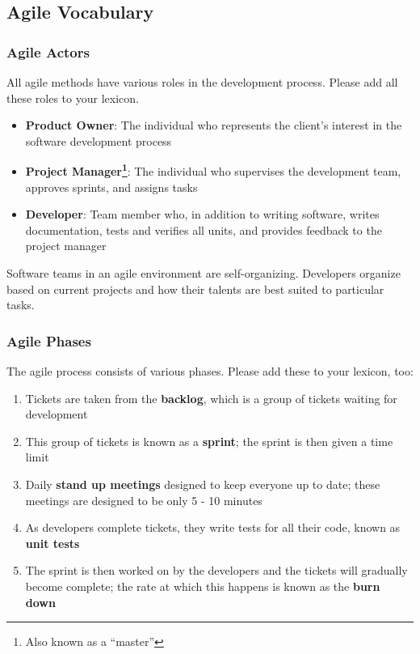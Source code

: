 \documentclass[aspectratio=169]{beamer}
\begin{document}
\subsection{Agile Vocabulary}
\begin{frame}
\frametitle{Agile Actors}
All agile methods have various roles in the development process. Please add all these roles to your lexicon.
\begin{itemize}
	\item \textbf{Product Owner}: The individual who represents the client's interest in the software development process
	\item \textbf{Project Manager\footnote{Also known as a ``master''}}: The individual who supervises the development team, approves sprints, and assigns tasks
	\item \textbf{Developer}: Team member who, in addition to writing software, writes documentation, tests and verifies all units, and provides feedback to the project manager
\end{itemize}
Software teams in an agile environment are self-organizing. Developers organize based on current projects and how their talents are best suited to particular tasks.
\end{frame}

\begin{frame}
\frametitle{Agile Phases}
The agile process consists of various phases. Please add these to your lexicon, too:
\begin{enumerate}
	\item Tickets are taken from the \textbf{backlog}, which is a group of tickets waiting for development
	\item This group of tickets is known as a \textbf{sprint}; the sprint is then given a time limit
	\item Daily \textbf{stand up meetings} designed to keep everyone up to date; these meetings are designed to be only 5 - 10 minutes
	\item As developers complete tickets, they write tests for all their code, known as \textbf{unit tests}
	\item The sprint is then worked on by the developers and the tickets will gradually become complete; the rate at which this happens is known as the \textbf{burn down}
\end{enumerate}
\end{frame}
\end{document}
